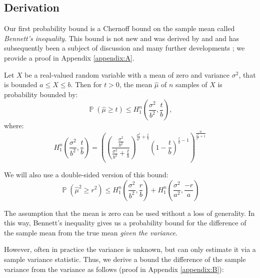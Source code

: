 \documentclass[runningheads, envcountsame, a4paper]{llncs}
\DeclareMathOperator{\p}{\mathbb{P}}
\begin{document}
\subsection{Derivation}
Our first probability bound is a Chernoff bound on the sample mean called \textit{Bennett's inequality}. 
This bound is not new and was derived by \cite{hoeffding1} and \cite{10.2307/2282438} and has subsequently been a subject of discussion and many further developments \cite{Bentkus08boundsfor,Pinelis2014,zbMATH00812598}; we %
provide a proof in Appendix \ref{appendix:A}.

\begin{theorem}\label{hoeffdings1}
Let $X$ be a real-valued random variable with a mean of zero and variance $\sigma^2$, that is bounded $a\le X\le b$. 
Then for $t>0$, the mean $\hat{\mu}$ of $n$ samples of $X$ is probability bounded by:
\begin{equation}\label{eq_no2}\p(\hat{\mu}\ge t)\le H_1^n\left(\frac{\sigma^2}{b^2},\frac{t}{b}\right),
\end{equation}
where:
\begin{equation*}
H_1^n\left(\frac{\sigma^2}{b^2},\frac{t}{b}\right) =
\left(\left(\frac{\frac{\sigma^2}{b^2}}{\frac{\sigma^2}{b^2}+\frac{t}{b}}\right)^{\frac{\sigma^2}{b^2}+\frac{t}{b}}
\left(1-\frac{t}{b}\right)^{\frac{t}{b}-1}\right)^{\frac{n}{\frac{\sigma^2}{b^2}+1}}
\end{equation*}
\end{theorem}

We will also use a double-sided version of this bound:
\begin{equation}\label{eq_no1}\p(\hat{\mu}^2\ge r^2) \le H_1^n\left(\frac{\sigma^2}{b^2},\frac{r}{b}\right) + H_1^n\left(\frac{\sigma^2}{a^2},\frac{-r}{a}\right) \end{equation}

The assumption that the mean is zero can be used without a loss of generality.
In this way, Bennett's inequality gives us a probability bound for the difference of the sample mean from the true mean \textit{given the variance}.

However, often in practice the variance is unknown, 
but can only estimate it via a sample variance statistic.
Thus, we derive a bound the difference of the sample variance from the variance as follows (proof in Appendix \ref{appendix:B}):
\end{document}
